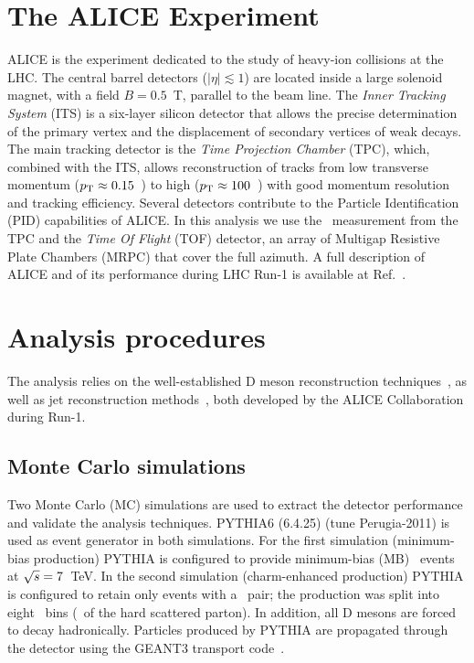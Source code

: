 \documentclass[a4paper]{jpconf}
\begin{document}
\section{The ALICE Experiment}
ALICE is the experiment dedicated to the study of heavy-ion collisions at the LHC.
The central barrel detectors ($\lvert \eta\rvert \lesssim 1$) are located inside a large solenoid magnet, with a
field $B = 0.5$~T, parallel to the beam line.
The \emph{Inner Tracking System} (ITS) is a six-layer silicon detector that allows the precise determination of the primary vertex 
and the displacement of secondary vertices of weak decays.
The main tracking detector is the \emph{Time Projection Chamber} (TPC), which, combined with the ITS, allows reconstruction of tracks 
from low transverse momentum ($p_{\rm T}\approx0.15$~\GeVc) to high
($p_{\rm T}\approx100$~\GeVc) with good momentum resolution and tracking efficiency.
Several detectors contribute to the Particle Identification (PID) capabilities of ALICE. 
In this analysis we use the \dedx\ measurement from the TPC and
the \emph{Time Of Flight} (TOF) detector,
an array of Multigap Resistive Plate Chambers (MRPC) that cover the full azimuth.
A full description of ALICE and of its performance during LHC Run-1 is available at Ref.~\cite{ALICE:2014b}.

\section{Analysis procedures}
The analysis relies on the well-established D meson reconstruction techniques~\cite{ALICE:2012d, ALICE:2016a}, as well as
jet reconstruction methods~\cite{ALICE:2013c, ALICE:2015a, ALICE:2015e}, both developed by the ALICE Collaboration during Run-1.

\subsection{Monte Carlo simulations}
Two Monte Carlo (MC) simulations are used to extract the detector performance and validate the analysis techniques.
PYTHIA6 (6.4.25)\cite{Sjostrand:2006} (tune Perugia-2011) is used as event generator in both simulations.
For the first simulation (minimum-bias production) PYTHIA is configured to provide minimum-bias (MB) \pp\ events at $\sqrt{s}=7$~TeV.
In the second simulation (charm-enhanced production) PYTHIA is configured to retain only events with a \ccbar\ pair; the production
was split into eight \pthard\ bins (\pT\ of the hard scattered parton). In addition, all D mesons are forced
to decay hadronically. 
Particles produced by PYTHIA are propagated through the detector using the GEANT3 transport code~\cite{GEANT3-url}.
\end{document}
